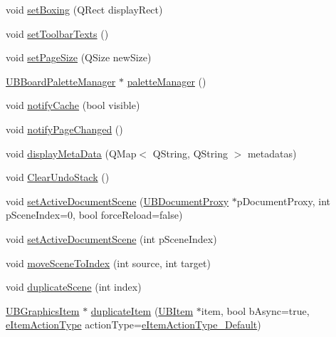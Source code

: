 \begin{DoxyCompactItemize}
\item 
void \hyperlink{class_u_b_board_controller_a864584d68dba2181af3e9e0ea6d639a2}{set\-Boxing} (Q\-Rect display\-Rect)
\item 
void \hyperlink{class_u_b_board_controller_a74de125b601b757c507440e4ef31a982}{set\-Toolbar\-Texts} ()
\item 
void \hyperlink{class_u_b_board_controller_ad0826689aa9e177e31aea29fa68eedd9}{set\-Page\-Size} (Q\-Size new\-Size)
\item 
\hyperlink{class_u_b_board_palette_manager}{U\-B\-Board\-Palette\-Manager} $\ast$ \hyperlink{class_u_b_board_controller_a536e1388e74f79a2120d0e585b862033}{palette\-Manager} ()
\item 
void \hyperlink{class_u_b_board_controller_a7b946d72f2a3e569f7493e0435d9d357}{notify\-Cache} (bool visible)
\item 
void \hyperlink{class_u_b_board_controller_aa9e16958970296eccadc60d0dbdf6b7d}{notify\-Page\-Changed} ()
\item 
void \hyperlink{class_u_b_board_controller_a501c3324ee98bd14b10f6b1345a48ccb}{display\-Meta\-Data} (Q\-Map$<$ Q\-String, Q\-String $>$ metadatas)
\item 
void \hyperlink{class_u_b_board_controller_a52b5505624b5584673fb2e75cbb269aa}{Clear\-Undo\-Stack} ()
\item 
void \hyperlink{class_u_b_board_controller_a6a1f06f9fecbba81ab58d813faae3fb0}{set\-Active\-Document\-Scene} (\hyperlink{class_u_b_document_proxy}{U\-B\-Document\-Proxy} $\ast$p\-Document\-Proxy, int p\-Scene\-Index=0, bool force\-Reload=false)
\item 
void \hyperlink{class_u_b_board_controller_afac505a5ca6669f6708427d914fb9b08}{set\-Active\-Document\-Scene} (int p\-Scene\-Index)
\item 
void \hyperlink{class_u_b_board_controller_aa7a87412c99f4e2c12b23468d946296e}{move\-Scene\-To\-Index} (int source, int target)
\item 
void \hyperlink{class_u_b_board_controller_ae84d5e3160402f05efcf708a8b81ba36}{duplicate\-Scene} (int index)
\item 
\hyperlink{class_u_b_graphics_item}{U\-B\-Graphics\-Item} $\ast$ \hyperlink{class_u_b_board_controller_abae2655269e06f72767de71b8513f6be}{duplicate\-Item} (\hyperlink{class_u_b_item}{U\-B\-Item} $\ast$item, bool b\-Async=true, \hyperlink{_u_b_board_controller_8h_a81078322485d3c56644c4f3414ac1c91}{e\-Item\-Action\-Type} action\-Type=\hyperlink{_u_b_board_controller_8h_a81078322485d3c56644c4f3414ac1c91abca7f0295fd0737e3216ce238a870c29}{e\-Item\-Action\-Type\-\_\-\-Default})

\end{DoxyCompactItemize}
